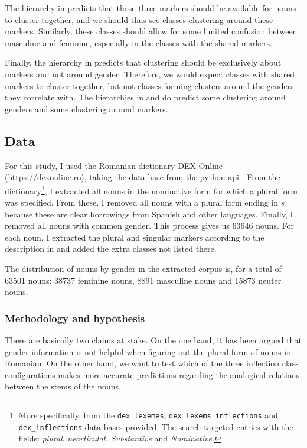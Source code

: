 The hierarchy in  predicts that those three markers should be available for nouns to cluster together, and we should thus see classes clustering around these markers. Similarly, these classes should allow for some limited confusion between masculine and feminine, especially in the classes with the shared markers.

Finally, the hierarchy in  predicts that clustering should be exclusively about markers and not around gender. Therefore, we would expect classes with shared markers to cluster together, but not classes forming clusters around the genders they correlate with. The hierarchies in  and  do predict some clustering around genders and some clustering around markers.

\subsection{Data}

For this study, I used the Romanian dictionary DEX Online (https://dexonline.ro), taking the data base from the python api \autocite{Navalici.2013}. From the dictionary\footnote{More specifically, from the \texttt{dex\_lexemes}, \texttt{dex\_lexems\_inflections} and \texttt{dex\_inflections} data bases provided. The search targeted entries with the fields: \textit{plural}, \textit{nearticulat}, \textit{Substantive} and \textit{Nominative}.}, I extracted all nouns in the nominative form for which a plural form was specified. From these, I removed all nouns with a plural form ending in \textit{s} because these are clear borrowings from Spanish and other languages. Finally, I removed all nouns with common gender. This process gives us 63646 nouns. For each noun, I extracted the plural and singular markers according to the description in \textcite{Cojocaru.2003} and added the extra classes not listed there.

The distribution of nouns by gender in the extracted corpus is, for a total of 63501 nouns: 38737 feminine nouns, 8891 masculine nouns and 15873 neuter nouns.

\subsubsection{Methodology and hypothesis}

There are basically two claims at stake. On the one hand, it has been argued that gender information is not helpful when figuring out the plural form of nouns in Romanian. On the other hand, we want to test which of the three inflection class configurations makes more accurate predictions regarding the analogical relations between the stems of the nouns.

